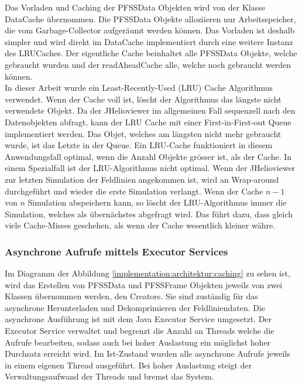 Das Vorladen und Caching der PFSSData Objekten wird von der Klasse DataCache übernommen. Die PFSSData Objekte alloziieren nur Arbeitsspeicher, die vom Garbage-Collector aufgeräumt werden können. Das Vorladen ist deshalb simpler und wird direkt im DataCache implementiert durch eine weitere Instanz des LRUCaches. Der eigentliche Cache beinhaltet alle PFSSData Objekte, welche gebraucht wurden und der readAheadCache alle, welche noch gebraucht werden können.\\
[\baselineskip] 
In dieser Arbeit wurde ein Least-Recently-Used (LRU) Cache Algorithmus verwendet. Wenn der Cache voll ist, löscht der Algorithmus das längste nicht verwendete Objekt. Da der JHelioviewer im allgemeinen Fall sequenzell nach den Datenobjekten abfragt, kann der LRU Cache mit einer First-in-First-out Queue implementiert werden. Das Objet, welches am längsten nicht mehr gebraucht wurde, ist das Letzte in der Queue. Ein LRU-Cache funktioniert in diesem Anwendungsfall optimal, wenn die Anzahl Objekte grösser ist, als der Cache. In einem Spezialfall ist der LRU-Algorithmus nicht optimal. Wenn der JHelioviewer zur letzten Simulation der Feldlinien angekommen ist, wird an Wrap-around durchgeführt und wieder die erste Simulation verlangt. Wenn der Cache $n-1$ von $n$ Simulation abspeichern kann, so löscht der LRU-Algorithmus immer die Simulation, welches als übernächstes abgefragt wird. Das führt dazu, dass gleich viele Cache-Misses geschehen, als wenn der Cache wesentlich kleiner währe.

\subsubsection{Asynchrone Aufrufe mittels Executor Services}
Im Diagramm der Abbildung \ref{implementation:architektur:caching} zu sehen ist, wird das Erstellen von PFSSData und PFSSFrame Objekten jeweils von zwei Klassen übernommen werden, den Creators. Sie sind zuständig für das asynchrone Herunterladen und Dekomprimieren der Feldliniendaten. Die asynchrone Ausführung ist mit dem Java Executor Service umgesetzt. Der Executor Service verwaltet und begrenzt die Anzahl an Threads welche die Aufrufe bearbeiten, sodass auch bei hoher Auslastung ein möglichst hoher Durchsatz erreicht wird. Im Ist-Zustand wurden alle asynchrone Aufrufe jeweils in einem eigenen Thread ausgeführt. Bei hoher Auslastung steigt der Verwaltungsaufwand der Threads und bremst das System.\\